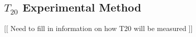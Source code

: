 \subsection{$T_{20}$ Experimental Method} %

[[ Need to fill in information on how T20 will be measured ]]